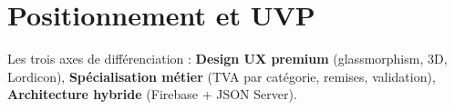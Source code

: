 \section{Positionnement et UVP}

\begin{center}
\end{center}

Les trois axes de différenciation : \textbf{Design UX premium} (glassmorphism, 3D, Lordicon), \textbf{Spécialisation métier} (TVA par catégorie, remises, validation), \textbf{Architecture hybride} (Firebase + JSON Server).
